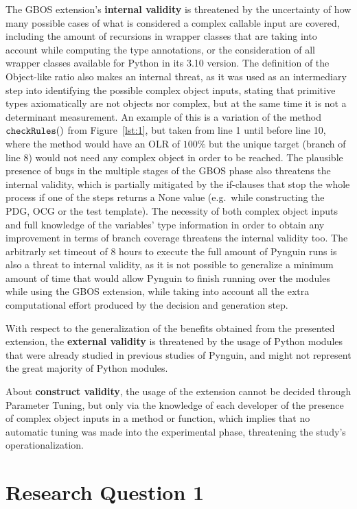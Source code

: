 \documentclass[%
  chapterprefix=false,%
  open=right,%
  twoside=true,%
  paper=a4,%
  logofile={Figures/logo.png},%
  thesistype=master,%
  UKenglish,%
]{se2thesis}
\newcommand{\callable}[2][]{\(\text{\texttt{#2}}(#1)\)}
\begin{document}
The GBOS extension's \textbf{internal validity} is threatened by the uncertainty of how many possible cases of what is considered a complex callable input are covered, including the amount of recursions in wrapper classes that are taking into account while computing the type annotations, or the consideration of all wrapper classes available for Python in its 3.10 version.
The definition of the Object-like ratio also makes an internal threat, as it was used as an intermediary step into identifying the possible complex object inputs, stating that primitive types axiomatically are not objects nor complex, but at the same time it is not a determinant measurement.
An example of this is a variation of the method \callable[]{checkRules} from Figure~\ref{lst:1}, but taken from line 1 until before line 10, where the method would have an OLR of \(100\%\) but the unique target (branch of line 8) would not need any complex object in order to be reached.
The plausible presence of bugs in the multiple stages of the GBOS phase also threatens the internal validity, which is partially mitigated by the if-clauses that stop the whole process if one of the steps returns a None value (e.g.\ while constructing the PDG, OCG or the test template).
The necessity of both complex object inputs and full knowledge of the variables' type information in order to obtain any improvement in terms of branch coverage threatens the internal validity too.
The arbitrarly set timeout of 8 hours to execute the full amount of Pynguin runs is also a threat to internal validity, as it is not possible to generalize a minimum amount of time that would allow Pynguin to finish running over the modules while using the GBOS extension, while taking into account all the extra computational effort produced by the decision and generation step.

With respect to the generalization of the benefits obtained from the presented extension, the \textbf{external validity} is threatened by the usage of Python modules that were already studied in previous studies of Pynguin, and might not represent the great majority of Python modules. 

About \textbf{construct validity}, the usage of the extension cannot be decided through Parameter Tuning, but only via the knowledge of each developer of the presence of complex object inputs in a method or function, which implies that no automatic tuning was made into the experimental phase, threatening the study's operationalization.


\section{Research Question 1}
\end{document}
